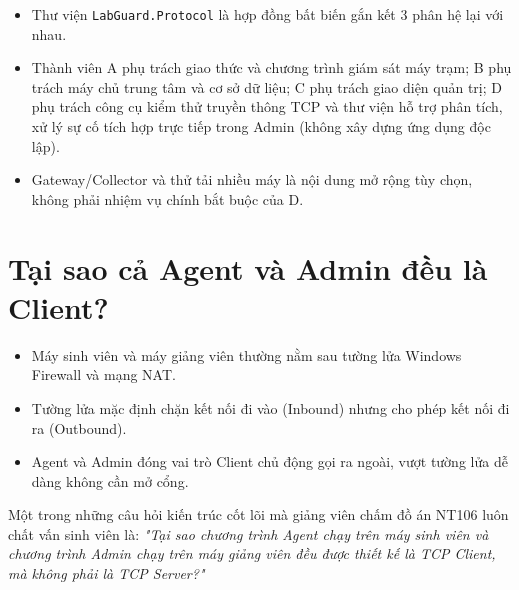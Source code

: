 \documentclass[12pt,a4paper]{article}
\begin{document}
\begin{takeawaybox}
\begin{itemize}[leftmargin=1.5em, itemsep=1pt]
  \item Thư viện \texttt{LabGuard.Protocol} là hợp đồng bất biến gắn kết 3 phân hệ lại với nhau.
  \item Thành viên A phụ trách giao thức và chương trình giám sát máy trạm; B phụ trách máy chủ trung tâm và cơ sở dữ liệu; C phụ trách giao diện quản trị; D phụ trách công cụ kiểm thử truyền thông TCP và thư viện hỗ trợ phân tích, xử lý sự cố tích hợp trực tiếp trong Admin (không xây dựng ứng dụng độc lập).
  \item Gateway/Collector và thử tải nhiều máy là nội dung mở rộng tùy chọn, không phải nhiệm vụ chính bắt buộc của D.
\end{itemize}
\end{takeawaybox}

\section{Tại sao cả Agent và Admin đều là Client?}

\begin{summarybox}
\begin{itemize}[leftmargin=1.5em, itemsep=1pt]
  \item Máy sinh viên và máy giảng viên thường nằm sau tường lửa Windows Firewall và mạng NAT.
  \item Tường lửa mặc định chặn kết nối đi vào (Inbound) nhưng cho phép kết nối đi ra (Outbound).
  \item Agent và Admin đóng vai trò Client chủ động gọi ra ngoài, vượt tường lửa dễ dàng không cần mở cổng.
\end{itemize}
\end{summarybox}

Một trong những câu hỏi kiến trúc cốt lõi mà giảng viên chấm đồ án NT106 luôn chất vấn sinh viên là: \textit{"Tại sao chương trình Agent chạy trên máy sinh viên và chương trình Admin chạy trên máy giảng viên đều được thiết kế là TCP Client, mà không phải là TCP Server?"}
\end{document}
